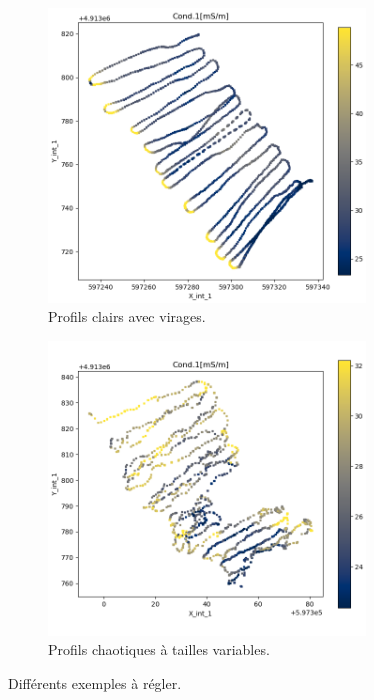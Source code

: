 \documentclass[12pt]{article}
\begin{document}
    \begin{figure}[ht!]
        \centering
        \begin{subfigure}[b]{0.475\textwidth}
            \centering
            \includegraphics[width=0.925\textwidth]{Images/PseudoProf_1.png}
            \caption[]{{ \small Profils clairs avec virages.}}    
            \label{fig:2_pp_1}
        \end{subfigure}
        \hfill
        \begin{subfigure}[b]{0.475\textwidth}  
            \centering 
            \includegraphics[width=0.925\textwidth]{Images/PseudoProf_2.png}
            \caption[]{{\small Profils chaotiques à tailles variables.}}    
        \end{subfigure}
        \caption{Différents exemples à régler.}
    \end{figure}
\end{document}
